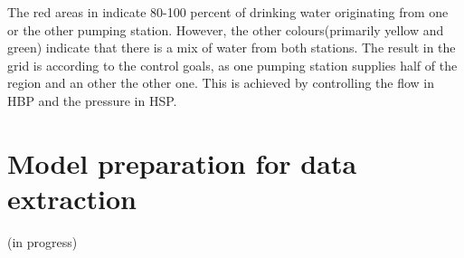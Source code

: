 \vspace{-3mm}

The red areas in  indicate 80-100 percent of drinking water originating from one or the other pumping station. However, the other colours(primarily yellow and green) indicate that there is a mix of water from both stations. The result in the grid is according to the control goals, as one pumping station supplies half of the region and an other the other one. This is achieved by controlling the flow in HBP and the pressure in HSP. 

\section{Model preparation for data extraction}
\label{model_preparation_for_data_extraction}
(in progress)